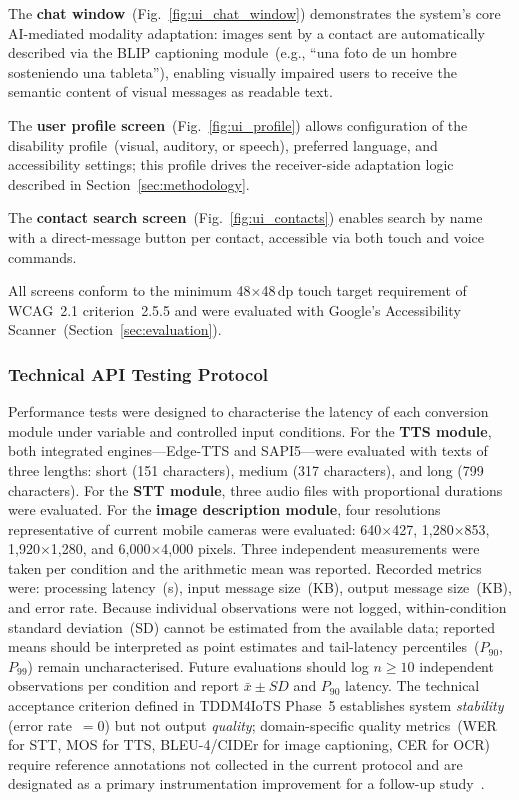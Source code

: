 \documentclass[journal]{IEEEtran}
\begin{document}
	The \textbf{chat window}~(Fig.~\ref{fig:ui_chat_window})
	demonstrates the system's core AI-mediated modality adaptation:
	images sent by a contact are automatically described via the
	BLIP captioning module~(e.g., ``una foto de un hombre sosteniendo
	una tableta''), enabling visually impaired users to receive the
	semantic content of visual messages as readable text.
	
	The \textbf{user profile screen}~(Fig.~\ref{fig:ui_profile})
	allows configuration of the disability profile~(visual, auditory,
	or speech), preferred language, and accessibility settings;
	this profile drives the receiver-side adaptation logic described
	in Section~\ref{sec:methodology}.
	
	The \textbf{contact search screen}~(Fig.~\ref{fig:ui_contacts})
	enables search by name with a direct-message button per contact,
	accessible via both touch and voice commands.
	
	All screens conform to the minimum 48$\times$48\,dp touch target
	requirement of WCAG~2.1 criterion~2.5.5 and were evaluated with
	Google's Accessibility Scanner~(Section~\ref{sec:evaluation}).
	
	\subsubsection{Technical API Testing Protocol}
	Performance tests were designed to characterise the latency of
	each conversion module under variable and controlled input
	conditions.
	For the \textbf{TTS module}, both integrated engines---Edge-TTS
	and SAPI5---were evaluated with texts of three lengths:
	short (151 characters), medium (317 characters),
	and long (799 characters).
	For the \textbf{STT module}, three audio files with proportional
	durations were evaluated.
	For the \textbf{image description module}, four resolutions
	representative of current mobile cameras were evaluated:
	640$\times$427, 1{,}280$\times$853, 1{,}920$\times$1{,}280,
	and 6{,}000$\times$4{,}000 pixels.
	Three independent measurements were taken per condition and the
	arithmetic mean was reported.
	Recorded metrics were: processing latency~(s), input message
	size~(KB), output message size~(KB), and error rate.
	Because individual observations were not logged, within-condition
	standard deviation~(SD) cannot be estimated from the available data;
	reported means should be interpreted as point estimates and
	tail-latency percentiles~($P_{90}$, $P_{99}$) remain uncharacterised.
	Future evaluations should log $n{\geq}10$ independent observations
	per condition and report $\bar{x}\pm SD$ and $P_{90}$ latency.
	The technical acceptance criterion defined in TDDM4IoTS Phase~5
	establishes system \emph{stability} (error rate~$=0$) but not
	output \emph{quality}; domain-specific quality metrics~(WER for
	STT, MOS for TTS, BLEU-4/CIDEr for image captioning, CER for OCR)
	require reference annotations not collected in the current protocol
	and are designated as a primary instrumentation improvement for
	a follow-up study~\cite{dognin2021,tan2021,radford2023}.
	
\end{document}
